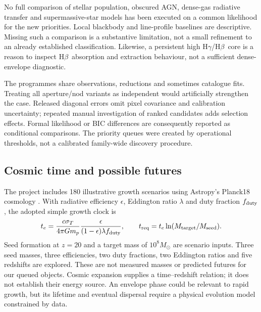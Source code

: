 \documentclass[11pt,a4paper]{article}
\newcommand{\hb}{H$\beta$}
\newcommand{\hg}{H$\gamma$}
\begin{document}
No full comparison of stellar population, obscured AGN, dense-gas radiative transfer and supermassive-star models has been executed on a common likelihood for the new priorities. Local blackbody and line-profile baselines are descriptive. Missing such a comparison is a substantive limitation, not a small refinement to an already established classification. Likewise, a persistent high \hg/\hb\ core is a reason to inspect \hb\ absorption and extraction behaviour, not a sufficient dense-envelope diagnostic.

The programmes share observations, reductions and sometimes catalogue fits. Treating all aperture/nod variants as independent would artificially strengthen the case. Released diagonal errors omit pixel covariance and calibration uncertainty; repeated manual investigation of ranked candidates adds selection effects. Formal likelihood or BIC differences are consequently reported as conditional comparisons. The priority queues were created by operational thresholds, not a calibrated family-wide discovery procedure.

\subsection{Cosmic time and possible futures}
The project includes 180 illustrative growth scenarios using Astropy's Planck18 cosmology \cite{planck,astropy}. With radiative efficiency $\epsilon$, Eddington ratio $\lambda$ and duty fraction $f_{\rm duty}$, the adopted simple growth clock is
\begin{equation}
t_e=\frac{c\sigma_T}{4\pi Gm_p}\frac{\epsilon}{(1-\epsilon)\lambda f_{\rm duty}},
\qquad t_{\rm req}=t_e\ln(M_{\rm target}/M_{\rm seed}).
\end{equation}
Seed formation at $z=20$ and a target mass of $10^8 M_\odot$ are scenario inputs. Three seed masses, three efficiencies, two duty fractions, two Eddington ratios and five redshifts are explored. These are not measured masses or predicted futures for our queued objects. Cosmic expansion supplies a time--redshift relation; it does not establish their energy source. An envelope phase could be relevant to rapid growth, but its lifetime and eventual dispersal require a physical evolution model constrained by data.
\end{document}
